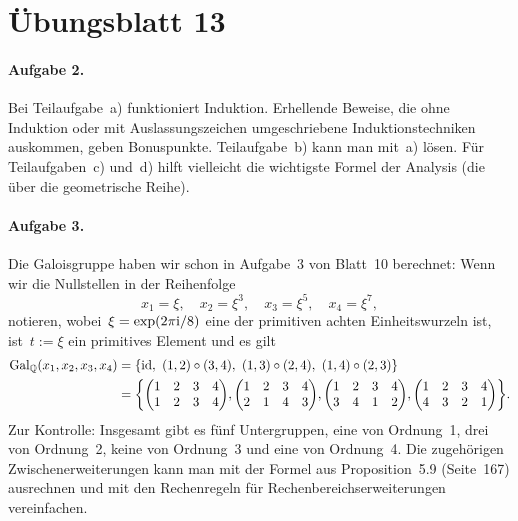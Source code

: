 \documentclass{../algblatt}
\begin{document}
\section*{Übungsblatt 13}

\paragraph{Aufgabe 2.} Bei Teilaufgabe~a) funktioniert Induktion. Erhellende
Beweise, die ohne Induktion oder mit Auslassungszeichen umgeschriebene
Induktionstechniken auskommen, geben Bonuspunkte. Teilaufgabe~b) kann man
mit~a) lösen. Für Teilaufgaben~c) und~d) hilft vielleicht die wichtigste Formel
der Analysis (die über die geometrische Reihe).

\paragraph{Aufgabe 3.} Die Galoisgruppe haben wir schon in Aufgabe~3 von
Blatt~10 berechnet: Wenn wir die Nullstellen in der Reihenfolge
\[ x_1 = \xi,\quad
  x_2 = \xi^3,\quad
  x_3 = \xi^5,\quad
  x_4 = \xi^7, \]
notieren, wobei~$\xi = \exp(2\pi\mathrm{i}/8)$ eine der primitiven achten
Einheitswurzeln ist, ist~$t := \xi$ ein primitives Element und es gilt
\begin{align*}
  \mathrm{Gal}_{\mathbb{Q}}(x_1,x_2,x_3,x_4) &=
    \left\{ \mathrm{id},\ (1,2)\circ(3,4),\ (1,3)\circ(2,4),\ (1,4)\circ(2,3) \right\} \\
  &=
    \left\{
      \begin{pmatrix}1&2&3&4\\1&2&3&4\end{pmatrix}\!,
      \begin{pmatrix}1&2&3&4\\2&1&4&3\end{pmatrix}\!,
      \begin{pmatrix}1&2&3&4\\3&4&1&2\end{pmatrix}\!,
      \begin{pmatrix}1&2&3&4\\4&3&2&1\end{pmatrix}
    \right\}\!.
\end{align*}
Zur Kontrolle: Insgesamt gibt es fünf Untergruppen, eine von Ordnung~1, drei
von Ordnung~2, keine von Ordnung~3 und eine von Ordnung~4. Die zugehörigen
Zwischenerweiterungen kann man mit der Formel aus Proposition~5.9 (Seite~167)
ausrechnen und mit den Rechenregeln für Rechenbereichserweiterungen
vereinfachen.
\end{document}
